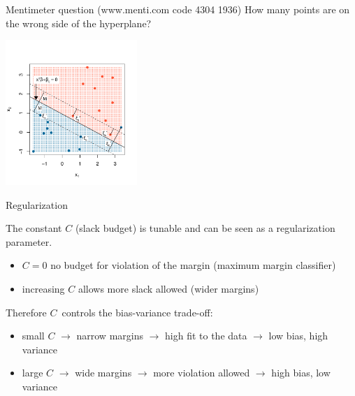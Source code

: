 \documentclass[notes]{beamer}          %
\begin{document}
\begin{frame}{Mentimeter question (www.menti.com code 4304 1936)}
How many points are on the wrong side of the hyperplane?
\begin{center}
\includegraphics[height=5.5cm]{../figures/week_2_classification/svm_support_vector_classifier.pdf}  
\end{center}
\end{frame}

\begin{frame}{Regularization}

The constant $C$ (slack budget) is tunable and can be seen as a regularization parameter.

\begin{itemize}
    \item $C = 0$ no budget for violation of the margin (maximum margin classifier)
    \item increasing $C$ allows more slack allowed (wider margins)
\end{itemize}

Therefore $C$\ controls the bias-variance trade-off:

\begin{itemize}
    \item small $C$ $\rightarrow$ narrow margins $\rightarrow$ high fit to the data $\rightarrow$ low bias, high variance
    \item large $C$ $\rightarrow$ wide margins $\rightarrow$ more violation allowed $\rightarrow$ high bias, low variance
\end{itemize}

\end{frame}
\end{document}
